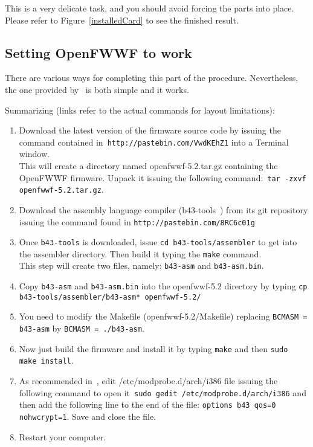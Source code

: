 \documentclass[conference]{IEEEtran}
\begin{document}
This is a very delicate task, and you should avoid forcing the parts into place. Please refer to Figure~\ref{installedCard} to see the finished result.

\subsection{Setting OpenFWWF to work}
There are various ways for completing this part of the procedure. Nevertheless, the one provided by~\cite{gnewsense} is both simple and it works.

Summarizing (links refer to the actual commands for layout limitations):
\begin{enumerate}
	\item Download the latest version of the firmware source code by issuing the command contained in~\texttt{http://pastebin.com/VwdKEhZ1} into a Terminal window. \\ This will create a directory named  openfwwf-5.2.tar.gz containing the OpenFWWF firmware. Unpack it issuing the following command:~\texttt{tar -zxvf openfwwf-5.2.tar.gz}.
	\item Download the assembly language compiler (b43-tools~\cite{b43-tools}) from its git repository issuing the command found in \texttt{http://pastebin.com/8RC6c01g}
	\item Once \texttt{b43-tools} is downloaded, issue \texttt{cd b43-tools/assembler} to get into the assembler directory. Then build it typing the \texttt{make} command.\\ This step will create two files, namely: \texttt{b43-asm} and \texttt{b43-asm.bin}.
	\item Copy \texttt{b43-asm} and \texttt{b43-asm.bin} into the openfwwf-5.2 directory by typing \texttt{cp b43-tools/assembler/b43-asm* openfwwf-5.2/}
	\item You need to modify the Makefile (openfwwf-5.2/Makefile) replacing \texttt{BCMASM = b43-asm} by \texttt{BCMASM = ./b43-asm}.
	\item Now just build the firmware and install it by typing \texttt{make} and then \texttt{sudo make install}.\label{make}
	\item As recommended in~\cite{OpenFWWF}, edit /etc/modprobe.d/arch/i386 file issuing the following command to open it~\texttt{sudo gedit /etc/modprobe.d/arch/i386} and then add the following line to the end of the file: \texttt{options b43 qos=0 nohwcrypt=1}. Save and close the file.
	\item Restart your computer.
\end{enumerate}
\end{document}
